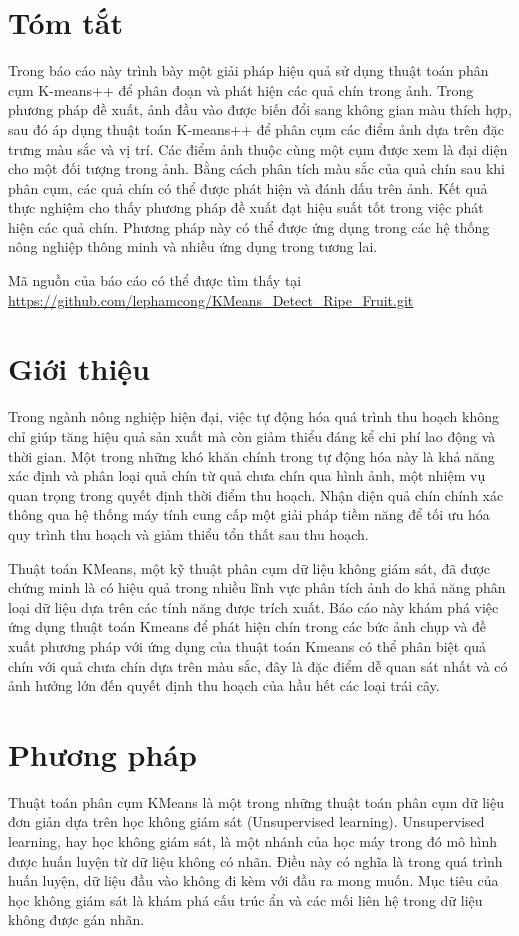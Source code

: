 \documentclass[a4paper]{article}
\begin{document}
\section*{Tóm tắt}
Trong báo cáo này trình bày một giải pháp hiệu quả sử dụng thuật toán phân cụm K-means++ để phân đoạn và phát hiện các quả chín trong ảnh. Trong phương pháp đề xuất, ảnh đầu vào được biến đổi sang không gian màu thích hợp, sau đó áp dụng thuật toán K-means++ để phân cụm các điểm ảnh dựa trên đặc trưng màu sắc và vị trí. Các điểm ảnh thuộc cùng một cụm được xem là đại diện cho một đối tượng trong ảnh. Bằng cách phân tích màu sắc của quả chín sau khi phân cụm, các quả chín có thể được phát hiện và đánh dấu trên ảnh. Kết quả thực nghiệm cho thấy phương pháp đề xuất đạt hiệu suất tốt trong việc phát hiện các quả chín. Phương pháp này có thể được ứng dụng trong các hệ thống nông nghiệp thông minh và nhiều ứng dụng trong tương lai.

Mã nguồn của báo cáo có thể được tìm thấy tại \url{https://github.com/lephamcong/KMeans_Detect_Ripe_Fruit.git}

\section{Giới thiệu}
Trong ngành nông nghiệp hiện đại, việc tự động hóa quá trình thu hoạch không chỉ giúp tăng hiệu quả sản xuất mà còn giảm thiểu đáng kể chi phí lao động và thời gian. Một trong những khó khăn chính trong tự động hóa này là khả năng xác định và phân loại quả chín từ quả chưa chín qua hình ảnh, một nhiệm vụ quan trọng trong quyết định thời điểm thu hoạch. Nhận diện quả chín chính xác thông qua hệ thống máy tính cung cấp một giải pháp tiềm năng để tối ưu hóa quy trình thu hoạch và giảm thiểu tổn thất sau thu hoạch.

Thuật toán KMeans, một kỹ thuật phân cụm dữ liệu không giám sát, đã được chứng minh là có hiệu quả trong nhiều lĩnh vực phân tích ảnh do khả năng phân loại dữ liệu dựa trên các tính năng được trích xuất. Báo cáo này khám phá việc ứng dụng thuật toán Kmeans để phát hiện chín trong các bức ảnh chụp và đề xuất phương pháp với ứng dụng của thuật toán Kmeans có thể phân biệt quả chín với quả chưa chín dựa trên màu sắc, đây là đặc điểm dễ quan sát nhất và có ảnh hưởng lớn đến quyết định thu hoạch của hầu hết các loại trái cây.

\section{Phương pháp}
Thuật toán phân cụm KMeans là một trong những thuật toán phân cụm dữ liệu đơn giản dựa trên học không giám sát (Unsupervised learning). Unsupervised learning, hay học không giám sát, là một nhánh của học máy trong đó mô hình được huấn luyện từ dữ liệu không có nhãn. Điều này có nghĩa là trong quá trình huấn luyện, dữ liệu đầu vào không đi kèm với đầu ra mong muốn. Mục tiêu của học không giám sát là khám phá cấu trúc ẩn và các mối liên hệ trong dữ liệu không được gán nhãn.
\end{document}
